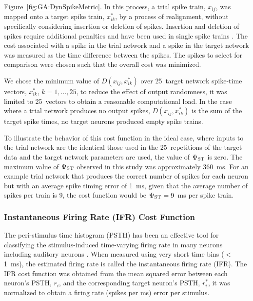 \smallskip{}

Figure~\ref{fig:GA:DynSpikeMetric}.  In this process, a trial spike
train, $x_{ij}$, was mapped onto a target spike train, $x_{ik}^{*}$,
by a process of realignment, without specifically considering
insertion or deletion of spikes. Insertion and deletion of spikes
require additional penalties and have been used in single spike trains
\citep{VictorGoldbergEtAl:2007,Aronov:2003}.  The cost associated with
a spike in the trial network and a spike in the target network was
measured as the time difference between the spikes. The spikes to
select for comparison were chosen such that the overall cost was
minimized.

\smallskip{}

We chose the minimum value of $D(x_{ij} ,x_{ik}^{*} )$ over 25~target
network spike-time vectors, $x_{ik}^{*}$, $k=1,\dots,25$, to reduce
the effect of output randomness, it was limited to 25~vectors to
obtain a reasonable computational load.  In the case where a trial
network produces no output spikes, $D(x_{ij} ,x_{ik}^{*})$ is the sum
of the target spike times, no target neurons produced empty spike
trains.

\smallskip{}

To illustrate the behavior of this cost function in the ideal case,
where {\ANF} inputs to the trial network are the identical those used in
the 25~repetitions of the target data and the target network
parameters are used, the value of $\Psi_{{\rm ST}}$ is zero. The
maximum value of $\Psi_{{\rm ST}}$ observed in this study was
approximately 360~ms.  For an example trial network that produces the
correct number of spikes for each neuron but with an average spike
timing error of 1~ms, given that the average number of spikes per
train is 9, the cost function would be $\Psi_{{\rm ST}}=9$~ms per
spike train.



\subsubsection{Instantaneous Firing Rate (IFR) Cost Function}\label{sec:GA:inst-firing-rate-cost-fn}


The peri-stimulus time histogram (PSTH) has been an effective tool for
classifying the stimulus-induced time-varying firing rate in many
neurons including auditory neurons
\citep{BlackburnSachs:1989,SmithRhode:1989}.  When measured using very
short time bins ($<$1~ms), the estimated firing rate is called the
instantaneous firing rate (IFR).  The IFR cost function was obtained
from the mean squared error between each neuron's PSTH, $r_{i} $, and
the corresponding target neuron's PSTH, $r_{i}^{*} $, it was
normalized to obtain a firing rate (spikes per ms) error per stimulus.

